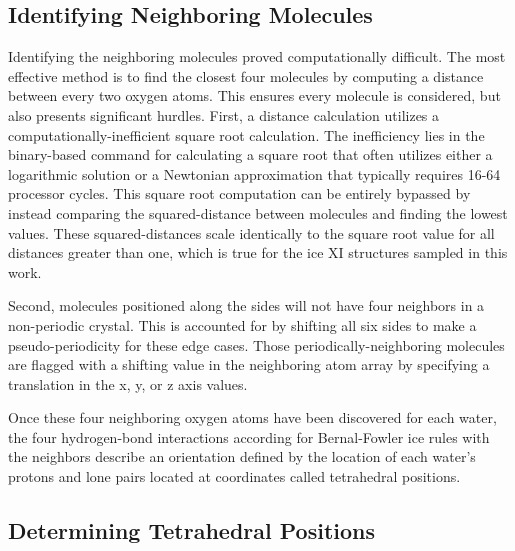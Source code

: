 \subsection{Identifying Neighboring Molecules}

Identifying the neighboring molecules proved computationally difficult. 
The most effective method is to find the closest four molecules by computing a distance between every two oxygen atoms.
This ensures every molecule is considered, but also presents significant hurdles.
First, a distance calculation utilizes a computationally-inefficient square root calculation.
The inefficiency lies in the binary-based command for calculating a square root that often utilizes either a logarithmic solution or a Newtonian approximation that typically requires 16-64 processor cycles.
This square root computation can be entirely bypassed by instead comparing the squared-distance between molecules and finding the lowest values.
These squared-distances scale identically to the square root value for all distances greater than one, which is true for the ice XI structures sampled in this work.

Second, molecules positioned along the sides  will not have four neighbors in a non-periodic crystal. 
This is accounted for by shifting all six sides to make a pseudo-periodicity for these edge cases. 
Those periodically-neighboring molecules are flagged with a shifting value in the neighboring atom array by specifying a translation in the x, y, or z axis values. 

Once these four neighboring oxygen atoms have been discovered for each water, the four hydrogen-bond interactions according for Bernal-Fowler ice rules with the neighbors describe an orientation defined by the location of each water's protons and lone pairs located at coordinates called tetrahedral positions.


\subsection{Determining Tetrahedral Positions}

